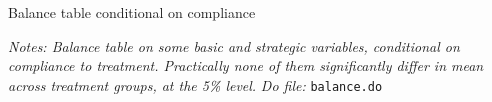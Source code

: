\documentclass[11pt]{article}
\begin{document}
\begin{table}[H]
\caption{Balance table conditional on compliance}
\label{Table_compliance}
\begin{center}
\scriptsize{}
\end{center}
 \footnotesize
\textit{Notes: Balance table on some basic and strategic variables, conditional on compliance to treatment. Practically none of them significantly differ in mean across treatment groups, at the 5\% level.} 
\textit{Do file: } \texttt{balance.do}
\end{table}





\end{document}
